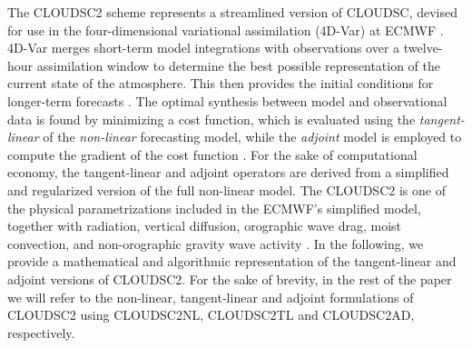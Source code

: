 \documentclass[../main.tex]{subfiles}
\begin{document}
    The CLOUDSC2 scheme represents a streamlined version of CLOUDSC, devised for use in the four-dimensional variational assimilation (4D-Var) at ECMWF \citep{courtier94}. 4D-Var merges short-term model integrations with observations over a twelve-hour assimilation window to determine the best possible representation of the current state of the atmosphere. This then provides the initial conditions for longer-term forecasts \citep{janiskova23}. The optimal synthesis between model and observational data is found by minimizing a cost function, which is evaluated using the \emph{tangent-linear} of the \emph{non-linear} forecasting model, while the \emph{adjoint} model is employed to compute the gradient of the cost function \citep{errico97, janiskova99}. For the sake of computational economy, the tangent-linear and adjoint operators are derived from a simplified and regularized version of the full non-linear model. The CLOUDSC2 is one of the physical parametrizations included in the ECMWF's simplified model, together with radiation, vertical diffusion, orographic wave drag, moist convection, and non-orographic gravity wave activity \citep{janiskova23}. In the following, we provide a mathematical and algorithmic representation of the tangent-linear and adjoint versions of CLOUDSC2. For the sake of brevity, in the rest of the paper we will refer to the non-linear, tangent-linear and adjoint formulations of CLOUDSC2 using CLOUDSC2NL, CLOUDSC2TL and CLOUDSC2AD, respectively.
\end{document}

